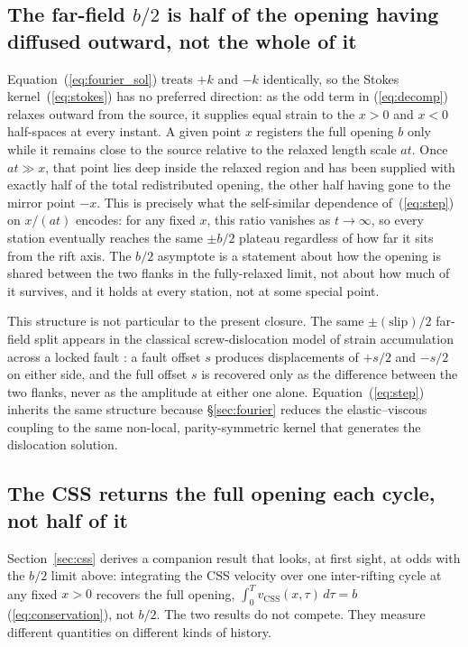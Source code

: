 \documentclass[extra]{gji}
\begin{document}
\subsection{The far-field \texorpdfstring{$b/2$}{b/2} is half of the opening having diffused outward, not the whole of it}

Equation~(\ref{eq:fourier_sol}) treats $+k$ and $-k$ identically, so the
Stokes kernel~(\ref{eq:stokes}) has no preferred direction: as the odd term
in (\ref{eq:decomp}) relaxes outward from the source, it supplies equal
strain to the $x>0$ and $x<0$ half-spaces at every instant. A given point
$x$ registers the full opening $b$ only while it remains close to the
source relative to the relaxed length scale $at$. Once $at\gg x$, that
point lies deep inside the relaxed region and has been supplied with
exactly half of the total redistributed opening, the other half having
gone to the mirror point $-x$. This is precisely what the self-similar
dependence of~(\ref{eq:step}) on $x/(at)$ encodes: for any fixed $x$, this
ratio vanishes as $t\to\infty$, so every station eventually reaches the same
$\pm b/2$ plateau regardless of how far it sits from the rift axis. The
$b/2$ asymptote is a statement about how the opening is shared between the
two flanks in the fully-relaxed limit, not about how much of it survives,
and it holds at every station, not at some special point.

This structure is not particular to the present closure. The same
$\pm(\text{slip})/2$ far-field split appears in the classical
screw-dislocation model of strain accumulation across a locked fault
\citep{savage1983dislocation}: a fault offset $s$ produces displacements of
$+s/2$ and $-s/2$ on either side, and the full offset $s$ is recovered only
as the difference between the two flanks, never as the amplitude at either
one alone. Equation~(\ref{eq:step}) inherits the same structure because
\S\ref{sec:fourier} reduces the elastic--viscous coupling to the same
non-local, parity-symmetric kernel that generates the dislocation solution.

\subsection{The CSS returns the full opening each cycle, not half of it}
\label{app:b2_css}

Section~\ref{sec:css} derives a companion result that looks, at first
sight, at odds with the $b/2$ limit above: integrating the CSS velocity
over one inter-rifting cycle at any fixed $x>0$ recovers the full opening,
$\int_0^T v_{\text{CSS}}(x,\tau)\,d\tau=b$ (\ref{eq:conservation}), not
$b/2$. The two results do not compete. They measure different quantities
on different kinds of history.
\end{document}
